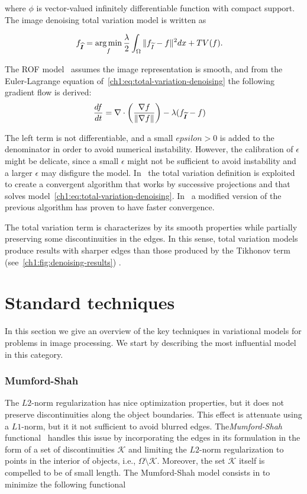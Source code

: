 where $\phi$ is vector-valued infinitely differentiable function with compact support. The image denoising total variation model is written as

\begin{align}
	f_{\bm{\widehat{I}}} &= \operatorname*{arg\,min}_{f} \frac{\lambda}{2} \int_{\Omega}{ \lVert f_{\widetilde{I}} - f\rVert^2dx} + TV(f).
	\label{ch1:eq:total-variation-denoising}
\end{align}

The ROF model~\cite{rudin92} assumes the image representation is smooth, and from the Euler-Lagrange equation of~\cref{ch1:eq:total-variation-denoising} the following gradient flow is derived:
\begin{align*}
	\frac{df}{dt} &= \nabla \cdot \left( \frac{\nabla f}{\lVert \nabla f\rVert } \right) - \lambda (f_{\widetilde{\bm{I}}} - f)
\end{align*}

The left term is not differentiable, and a small $epsilon >0$ is added to the denominator in order to avoid numerical instability. However, the calibration of $\epsilon$ might be delicate, since a small $\epsilon$ might not be sufficient to avoid instability and a larger $\epsilon$ may disfigure the model. In~\cite{chambolle04} the total variation definition is exploited to create a convergent algorithm that works by successive projections and that solves model~\cref{ch1:eq:total-variation-denoising}. In~\cite{beck09a} a modified version of the previous algorithm has proven to have faster convergence. 

The total variation term is characterizes by its smooth properties while partially preserving some discontinuities in the edges. In this sense, total variation models produce results with sharper edges than those produced by the Tikhonov term (see~\cref{ch1:fig:denoising-results}) .

\section{Standard techniques}

In this section we give an overview of the key techniques in variational models for problems in image processing. We start by describing the most influential model in this category.

\subsubsection{Mumford-Shah}
The $L2$-norm regularization has nice optimization properties, but it does not preserve discontinuities along the object boundaries. This effect is attenuate using a $L1$-norm, but it it not sufficient to avoid blurred edges. The\emph{Mumford-Shah} functional~\cite{mumford89} handles this issue by incorporating the edges in its formulation in the form of a set of discontinuities $\mathcal{K}$ and limiting the $L2$-norm regularization to points in the interior of objects, i.e.,  $\Omega \setminus \mathcal{K}$. Moreover, the set $\mathcal{K}$ itself is compelled to be of small length. The Mumford-Shah model consists in to minimize the following functional 


